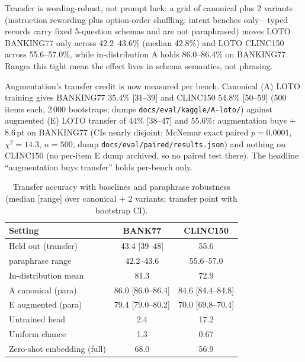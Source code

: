 Transfer is wording-robust, not prompt luck: a grid of canonical plus 2
variants (instruction
rewording plus option-order shuffling; intent benches only---typed records
carry fixed 5-question schemas and are not paraphrased) moves LOTO BANKING77 only across
42.2--43.6\% (median 42.8\%) and LOTO CLINC150 across 55.6--57.0\%, while
in-distribution A holds 86.0--86.4\% on BANKING77. Ranges this tight mean the
effect lives in schema semantics, not phrasing.

Augmentation's transfer credit is now measured per bench. Canonical (A) LOTO
training gives BANKING77 35.4\% [31--39] and CLINC150 54.8\% [50--59]
(500 items each, 2\,000 bootstraps; dumps
\texttt{docs/eval/kaggle/A-loto/}) against augmented (E) LOTO transfer of
 44\% [38--47] and 55.6\%: augmentation buys $+$8.6\,pt on BANKING77 (CIs
 nearly disjoint; McNemar exact paired $p{=}0.0001$, $\chi^2{=}14.3$,
 $n{=}500$, dump \texttt{docs/eval/paired/results.json}) and nothing on
 CLINC150 (no per-item E dump archived, so no paired test there). The headline ``augmentation buys
 transfer'' holds per-bench only.

\begin{table}[htbp]
\caption{Transfer accuracy with baselines and paraphrase robustness (median
[range] over canonical + 2 variants; transfer point with bootstrap CI).}
\label{tab:para}
\begin{center}
\setlength{\tabcolsep}{3pt}
\begin{footnotesize}
\begin{tabular}{lcc}
\toprule
Setting & BANK77 & CLINC150 \\
\midrule
Held out (transfer) & 43.4 [39--48] & 55.6 \\
\quad paraphrase range & 42.2--43.6 & 55.6--57.0 \\
In-distribution mean & 81.3 & 72.9 \\
A canonical (para) & 86.0 [86.0--86.4] & 84.6 [84.4--84.8] \\
E augmented (para) & 79.4 [79.0--80.2] & 70.0 [69.8--70.4] \\
Untrained head & 2.4 & 17.2 \\
Uniform chance & 1.3 & 0.67 \\
Zero-shot embedding (full) & 68.0 & 56.9 \\
\bottomrule
\end{tabular}
\end{footnotesize}
\end{center}
\end{table}

